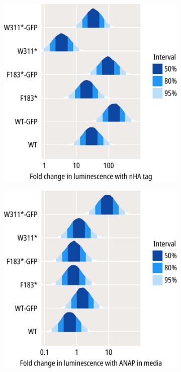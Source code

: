 \begin{figure}[h]
\begin{subfigure}[t]{0.45\textwidth}
	\end{subfigure}
	\vfill
	\begin{subfigure}[t]{0.45\textwidth}
		\caption{}\label{ch3fig:surface_expression_3}
		\centering
		\includegraphics[width=\textwidth]{surface_expression_3.pdf}
	\end{subfigure}
	\hfill
	\begin{subfigure}[t]{0.45\textwidth}
		\caption{}\label{ch3fig:surface_expression_4}
		\centering
		\includegraphics[width=\textwidth]{surface_expression_4.pdf}

\end{subfigure}
\end{figure}
